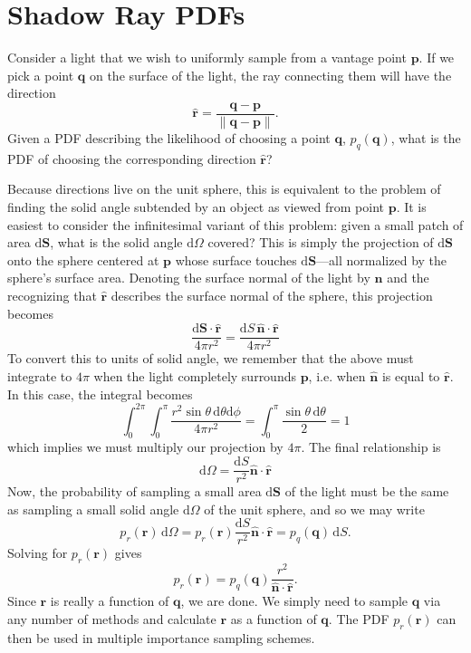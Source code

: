 \documentclass{article}
\begin{document}
\section*{Shadow Ray PDFs}

Consider a light that we wish to uniformly sample from a vantage point $\mathbf{p}$. If we pick a point $\mathbf{q}$ on the surface of the light, the ray connecting them will have the direction
\[
	\hat{\mathbf{r}} = \frac{\mathbf{q} - \mathbf{p}}{\|\mathbf{q} - \mathbf{p}\|}.
\] 
Given a PDF describing the likelihood of choosing a point $\mathbf{q}$, $p_q(\mathbf{q})$, what is the PDF of choosing the corresponding direction $\hat{\mathbf{r}}$?

Because directions live on the unit sphere, this is equivalent to the problem of finding the solid angle subtended by an object as viewed from point $\mathbf{p}$. It is easiest to consider the infinitesimal variant of this problem: given a small patch of area $\mathrm{d}\mathbf{S}$, what is the solid angle $\mathrm{d}\Omega$ covered? This is simply the projection of $\mathrm{d}\mathbf{S}$ onto the sphere centered at $\mathbf{p}$ whose surface touches $\mathrm{d}\mathbf{S}$---all normalized by the sphere's surface area. Denoting the surface normal of the light by $\hat{\mathbf{n}}$ and the recognizing that $\hat{\mathbf{r}}$ describes the surface normal of the sphere, this projection becomes
\[
	\frac{\mathrm{d}\mathbf{S} \cdot \hat{\mathbf{r}}}{4\pi r^2} = \frac{\mathrm{d}S\,\hat{\mathbf{n}}\cdot\hat{\mathbf{r}}}{4\pi r^2}
\]
To convert this to units of solid angle, we remember that the above must integrate to $4\pi$ when the light completely surrounds $\mathbf{p}$, i.e. when $\hat{\mathbf{n}}$ is equal to $\hat{\mathbf{r}}$. In this case, the integral becomes
\[
	\int_0^{2\pi}\int_0^{\pi}\frac{r^2\sin\theta\,\mathrm{d}\theta\mathrm{d}\phi}{4\pi r^2} = \int_0^{\pi}\frac{\sin\theta\,\mathrm{d}\theta}{2} = 1
\]
which implies we must multiply our projection by $4\pi$. The final relationship is
\[
	\mathrm{d}\Omega = \frac{\mathrm{d}S}{r^2}\hat{\mathbf{n}}\cdot\hat{\mathbf{r}}
\]
Now, the probability of sampling a small area $\mathrm{d}\mathbf{S}$ of the light must be the same as sampling a small solid angle $\mathrm{d}\Omega$ of the unit sphere, and so we may write
\[
	p_{r}(\mathbf{r})\,\mathrm{d}\Omega = p_{r}(\mathbf{r})\frac{\mathrm{d}S}{r^2}\hat{\mathbf{n}}\cdot\hat{\mathbf{r}} = p_q(\mathbf{q})\,\mathrm{d}S.
\]
Solving for $p_{r}(\mathbf{r})$ gives
\[
	p_{r}(\mathbf{r}) = p_q(\mathbf{q})\frac{r^2}{\hat{\mathbf{n}}\cdot\hat{\mathbf{r}}}.
\]
Since $\mathbf{r}$ is really a function of $\mathbf{q}$, we are done. We simply need to sample $\mathbf{q}$ via any number of methods and calculate $\mathbf{r}$ as a function of $\mathbf{q}$. The PDF $p_r(\mathbf{r})$ can then be used in multiple importance sampling schemes.
\end{document}

